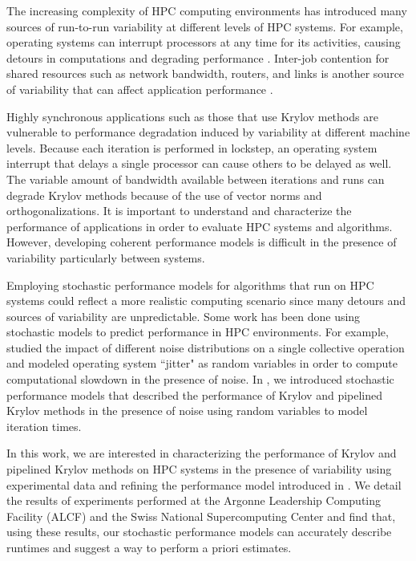 \documentclass[sigconf, anonymous]{acmart}
\begin{document}
The increasing complexity of HPC computing environments has introduced many sources of run-to-run variability at different levels of HPC systems. 
For example, operating systems can interrupt processors at any time for its activities, causing detours in computations and degrading performance \cite{hoefler2010characterizing, FerreiraBridgesBrightwell08}.
Inter-job contention for shared resources such as network bandwidth, routers, and links is another source of variability that can affect application performance \cite{parker2017early, chunduri2017run}. 

Highly synchronous applications such as those that use Krylov methods are vulnerable to performance degradation induced by variability at different machine levels. 
Because each iteration is performed in lockstep, an operating system interrupt that delays a single processor can cause others to be delayed as well.
The variable amount of bandwidth available between iterations and runs can degrade Krylov methods because of the use of vector norms and orthogonalizations.
It is important to understand and characterize the performance of applications in order to evaluate HPC systems and algorithms. 
However, developing coherent performance models is difficult in the presence of variability \cite{beckman2006influence, HoeflerLumsdaineRehm07} particularly between systems. 

Employing stochastic performance models for algorithms that run on HPC systems could reflect a more realistic computing scenario since many detours and sources of variability are unpredictable.
Some work has been done using stochastic models to predict performance in HPC environments. 
For example, \cite{agarwal2005impact} studied the impact of different noise distributions on a single collective operation and \cite{seelam2010extreme} modeled operating system 
 ``jitter" as random variables in order to compute computational slowdown in the 
  presence of noise.
In \cite{morgan2016krylov}, we introduced stochastic performance models that described the performance of Krylov and pipelined Krylov methods in the presence of noise using random variables to model iteration times. 

In this work, we are interested in characterizing the performance of Krylov and pipelined Krylov methods on HPC systems in the presence of variability using experimental data and refining the performance model introduced in \cite{morgan2016krylov}.
We detail the results of experiments performed at the Argonne Leadership Computing Facility (ALCF) and the Swiss National Supercomputing Center and find that, using these results, our stochastic performance models can accurately describe runtimes and suggest a way to perform a priori estimates.
\end{document}
